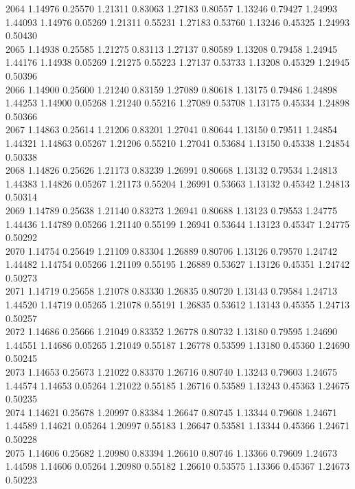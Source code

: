 {2064 1.14976 0.25570 1.21311 0.83063 1.27183 0.80557 1.13246 0.79427 1.24993 1.44093 1.14976 0.05269 1.21311 0.55231 1.27183 0.53760 1.13246 0.45325 1.24993 0.50430 \\
2065 1.14938 0.25585 1.21275 0.83113 1.27137 0.80589 1.13208 0.79458 1.24945 1.44176 1.14938 0.05269 1.21275 0.55223 1.27137 0.53733 1.13208 0.45329 1.24945 0.50396 \\
2066 1.14900 0.25600 1.21240 0.83159 1.27089 0.80618 1.13175 0.79486 1.24898 1.44253 1.14900 0.05268 1.21240 0.55216 1.27089 0.53708 1.13175 0.45334 1.24898 0.50366 \\
2067 1.14863 0.25614 1.21206 0.83201 1.27041 0.80644 1.13150 0.79511 1.24854 1.44321 1.14863 0.05267 1.21206 0.55210 1.27041 0.53684 1.13150 0.45338 1.24854 0.50338 \\
2068 1.14826 0.25626 1.21173 0.83239 1.26991 0.80668 1.13132 0.79534 1.24813 1.44383 1.14826 0.05267 1.21173 0.55204 1.26991 0.53663 1.13132 0.45342 1.24813 0.50314 \\
2069 1.14789 0.25638 1.21140 0.83273 1.26941 0.80688 1.13123 0.79553 1.24775 1.44436 1.14789 0.05266 1.21140 0.55199 1.26941 0.53644 1.13123 0.45347 1.24775 0.50292 \\
2070 1.14754 0.25649 1.21109 0.83304 1.26889 0.80706 1.13126 0.79570 1.24742 1.44482 1.14754 0.05266 1.21109 0.55195 1.26889 0.53627 1.13126 0.45351 1.24742 0.50273 \\
2071 1.14719 0.25658 1.21078 0.83330 1.26835 0.80720 1.13143 0.79584 1.24713 1.44520 1.14719 0.05265 1.21078 0.55191 1.26835 0.53612 1.13143 0.45355 1.24713 0.50257 \\
2072 1.14686 0.25666 1.21049 0.83352 1.26778 0.80732 1.13180 0.79595 1.24690 1.44551 1.14686 0.05265 1.21049 0.55187 1.26778 0.53599 1.13180 0.45360 1.24690 0.50245 \\
2073 1.14653 0.25673 1.21022 0.83370 1.26716 0.80740 1.13243 0.79603 1.24675 1.44574 1.14653 0.05264 1.21022 0.55185 1.26716 0.53589 1.13243 0.45363 1.24675 0.50235 \\
2074 1.14621 0.25678 1.20997 0.83384 1.26647 0.80745 1.13344 0.79608 1.24671 1.44589 1.14621 0.05264 1.20997 0.55183 1.26647 0.53581 1.13344 0.45366 1.24671 0.50228 \\
2075 1.14606 0.25682 1.20980 0.83394 1.26610 0.80746 1.13366 0.79609 1.24673 1.44598 1.14606 0.05264 1.20980 0.55182 1.26610 0.53575 1.13366 0.45367 1.24673 0.50223 \\
}\fcproduct

